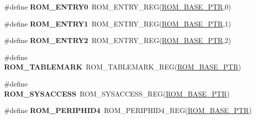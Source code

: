 \begin{DoxyCompactItemize}
\item 
\hypertarget{group___r_o_m___register___accessor___macros_gada69a41d0a902f6012e684efb7c9e3ad}{}\#define {\bfseries R\+O\+M\+\_\+\+E\+N\+T\+R\+Y0}~R\+O\+M\+\_\+\+E\+N\+T\+R\+Y\+\_\+\+R\+E\+G(\hyperlink{group___r_o_m___peripheral_ga5ad426d10b6832ca7012e8767113f686}{R\+O\+M\+\_\+\+B\+A\+S\+E\+\_\+\+P\+T\+R},0)\label{group___r_o_m___register___accessor___macros_gada69a41d0a902f6012e684efb7c9e3ad}

\item 
\hypertarget{group___r_o_m___register___accessor___macros_gac1064716d92d1384ff4b0bf063baabe6}{}\#define {\bfseries R\+O\+M\+\_\+\+E\+N\+T\+R\+Y1}~R\+O\+M\+\_\+\+E\+N\+T\+R\+Y\+\_\+\+R\+E\+G(\hyperlink{group___r_o_m___peripheral_ga5ad426d10b6832ca7012e8767113f686}{R\+O\+M\+\_\+\+B\+A\+S\+E\+\_\+\+P\+T\+R},1)\label{group___r_o_m___register___accessor___macros_gac1064716d92d1384ff4b0bf063baabe6}

\item 
\hypertarget{group___r_o_m___register___accessor___macros_ga0ae5079cc5e456ff696440862af66421}{}\#define {\bfseries R\+O\+M\+\_\+\+E\+N\+T\+R\+Y2}~R\+O\+M\+\_\+\+E\+N\+T\+R\+Y\+\_\+\+R\+E\+G(\hyperlink{group___r_o_m___peripheral_ga5ad426d10b6832ca7012e8767113f686}{R\+O\+M\+\_\+\+B\+A\+S\+E\+\_\+\+P\+T\+R},2)\label{group___r_o_m___register___accessor___macros_ga0ae5079cc5e456ff696440862af66421}

\item 
\hypertarget{group___r_o_m___register___accessor___macros_gaf0a5aeb4d78f9d16a13d1e5372484075}{}\#define {\bfseries R\+O\+M\+\_\+\+T\+A\+B\+L\+E\+M\+A\+R\+K}~R\+O\+M\+\_\+\+T\+A\+B\+L\+E\+M\+A\+R\+K\+\_\+\+R\+E\+G(\hyperlink{group___r_o_m___peripheral_ga5ad426d10b6832ca7012e8767113f686}{R\+O\+M\+\_\+\+B\+A\+S\+E\+\_\+\+P\+T\+R})\label{group___r_o_m___register___accessor___macros_gaf0a5aeb4d78f9d16a13d1e5372484075}

\item 
\hypertarget{group___r_o_m___register___accessor___macros_gae51b2981e6f366d1b80e622b8642423b}{}\#define {\bfseries R\+O\+M\+\_\+\+S\+Y\+S\+A\+C\+C\+E\+S\+S}~R\+O\+M\+\_\+\+S\+Y\+S\+A\+C\+C\+E\+S\+S\+\_\+\+R\+E\+G(\hyperlink{group___r_o_m___peripheral_ga5ad426d10b6832ca7012e8767113f686}{R\+O\+M\+\_\+\+B\+A\+S\+E\+\_\+\+P\+T\+R})\label{group___r_o_m___register___accessor___macros_gae51b2981e6f366d1b80e622b8642423b}

\item 
\hypertarget{group___r_o_m___register___accessor___macros_gaba945b0541931f93e793ba6b9afd31fb}{}\#define {\bfseries R\+O\+M\+\_\+\+P\+E\+R\+I\+P\+H\+I\+D4}~R\+O\+M\+\_\+\+P\+E\+R\+I\+P\+H\+I\+D4\+\_\+\+R\+E\+G(\hyperlink{group___r_o_m___peripheral_ga5ad426d10b6832ca7012e8767113f686}{R\+O\+M\+\_\+\+B\+A\+S\+E\+\_\+\+P\+T\+R})\label{group___r_o_m___register___accessor___macros_gaba945b0541931f93e793ba6b9afd31fb}


\end{DoxyCompactItemize}
